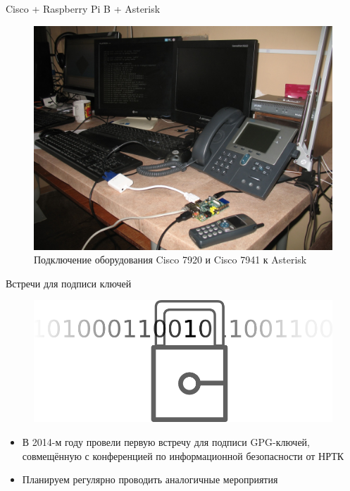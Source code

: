 \documentclass[presentation]{beamer}
\begin{document}
\begin{frame}[label=sec-2-2-2]{Cisco + Raspberry Pi B + Asterisk}
  \begin{figure}[htb]
    \centering
    \includegraphics[width=.9\linewidth]{cadr-cisco-asterisk}
    \caption{Подключение оборудования Cisco 7920 и Cisco 7941 к
      Asterisk}
  \end{figure}
\end{frame}

\begin{frame}[label=sec-2-2-2]{Встречи для подписи ключей}
  \begin{figure}[htb]
    \centering
    \includegraphics[width=.9\linewidth]{cadr-logo-crypto}
  \end{figure}
  \begin{itemize}
    \item В 2014-м году провели первую встречу для подписи GPG-ключей,
      совмещённую с конференцией по информационной безопасности от
      НРТК
    \item Планируем регулярно проводить аналогичные мероприятия
  \end{itemize}
\end{frame}
\end{document}

